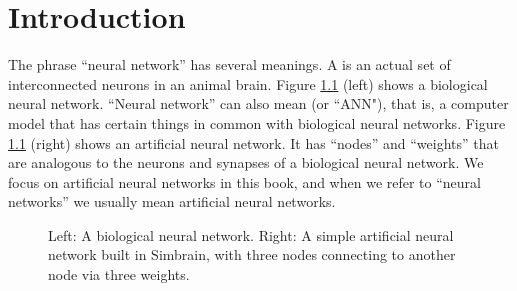 \chapter{Introduction}\label{ch_intro}


The phrase ``neural network'' has several meanings. A  is an actual set of interconnected neurons in an animal brain. Figure \ref{introNets} (left) shows a biological neural network. ``Neural network'' can also mean  (or ``ANN"), that is, a computer model that has certain things in common with biological neural networks. Figure \ref{introNets} (right) shows an artificial neural network. It has ``nodes'' and ``weights'' that are analogous to the neurons and synapses of a biological neural network. We focus on artificial neural networks in this book, and when we refer to ``neural networks'' we usually mean artificial neural networks.

\begin{figure}[h]
\centering
{}
\hspace*{.2in}
\caption[Left: Mark Miller, Nelson Lab, Brandeis University. Licensed Under: CC BY-ND; Right: Simbrain screenshot.]{Left: A biological neural network. Right: A simple artificial neural network built in Simbrain, with three nodes connecting to another node via three weights.}
\label{introNets}
\end{figure}

